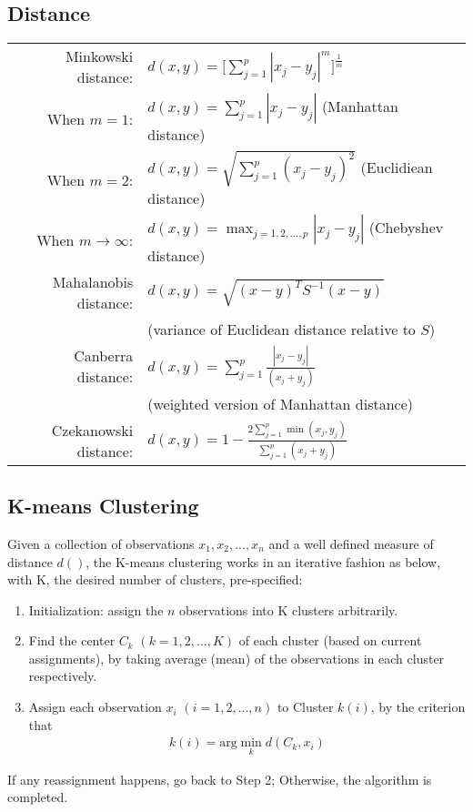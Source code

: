 \documentclass[12pt]{extarticle}
\newcommand{\<}{\langle}
\renewcommand{\>}{\rangle}
\theoremstyle{definition}
\begin{document}
\subsection{Distance}
\begin{tcolorbox}[enhanced, drop fuzzy shadow, title=Distance]
\renewcommand{\arraystretch}{2}
\begin{tabular}{rl}
Minkowski distance:& $d(x,y)=\Big[ \sum^p_{j=1} |x_j -y_j|^m \Big]^\frac{1}{m}$\\
When $m=1$:& $d(x,y)=\sum^p_{j=1} |x_j -y_j|$ (Manhattan distance)\\
When $m=2$:& $d(x,y)=\sqrt{\sum^p_{j=1} (x_j -y_j)^2}$ (Euclidiean distance)\\
When $m \rightarrow \infty$:& $d(x,y)= \max_{j=1,2,...,p} |x_j -y_j|$ (Chebyshev distance)\\
Mahalanobis distance:& $d(x,y)=\sqrt{(x-y)^T S^{-1} (x-y)}$\\
& (variance of Euclidean distance relative to $S$)\\
Canberra distance:& $d(x,y)=\sum^p_{j=1} \frac{|x_j -y_j|}{(x_j +y_j)}$\\
& (weighted version of Manhattan distance)\\
Czekanowski distance:& $d(x,y)=1-\frac{2\sum^p_{j=1}\min(x_j,y_j)}{\sum^p_{j=1}(x_j +y_j)}$
\end{tabular}
\end{tcolorbox}

\subsection{K-means Clustering}
\begin{tcolorbox}[enhanced, drop fuzzy shadow, title=K-means Clustering]
Given a collection of observations $x_1,x_2,...,x_n$ and a well defined measure of distance $d()$, the K-means clustering works in an iterative fashion as below, with K, the desired number of clusters, pre-specified:
\begin{enumerate}
    \item Initialization: assign the $n$ observations into K clusters arbitrarily.\\
    \item Find the center $C_k$ $(k=1,2,...,K)$ of each cluster (based on current assignments), by taking average (mean) of the observations in each cluster respectively.\\
    \item Assign each observation $x_i$ $(i=1,2,...,n)$ to Cluster $k(i)$, by the criterion that
    \begin{align*}
        k(i)=\text{arg}\min_k d(C_k, x_i)
    \end{align*}
\end{enumerate}
If any reassignment happens, go back to Step 2; Otherwise, the algorithm is completed.
\end{tcolorbox}
\end{document}
